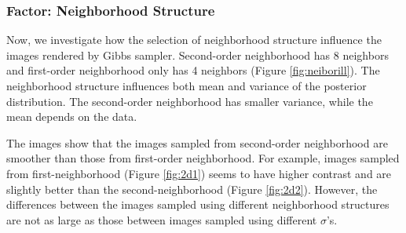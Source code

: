 \subsubsection{Factor: Neighborhood Structure}
Now, we investigate how the selection of neighborhood structure influence the images rendered by Gibbs sampler. 
Second-order neighborhood has 8 neighbors and first-order neighborhood only has 4 neighbors (Figure \ref{fig:neiborill}). 
The neighborhood structure influences both mean and variance of the posterior distribution. 
The second-order neighborhood has smaller variance, while the mean depends on the data. 

The images show that the images sampled from second-order neighborhood are smoother than those from first-order neighborhood. 
For example, images sampled from first-neighborhood (Figure \ref{fig:2d1}) seems to have higher contrast and are slightly better than the second-neighborhood (Figure \ref{fig:2d2}).
However, the differences between the images sampled using different neighborhood structures are not as large as those between images sampled using different $\sigma$'s.

